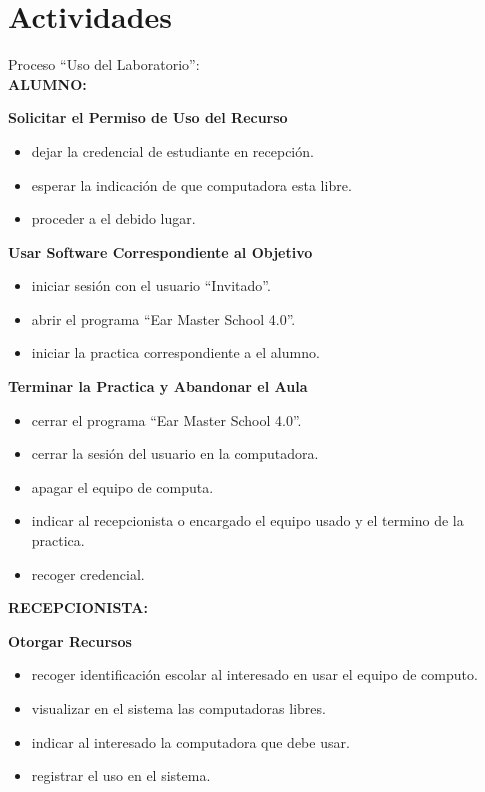 \documentclass[spanish,12pt,letterpapper]{article}
\begin{document}
	\section{Actividades}
	Proceso ``Uso del Laboratorio'':\\
	
	\textbf{ALUMNO:\\}
	
	\textbf{Solicitar el Permiso de Uso del Recurso}
	\begin{itemize}
	\item dejar la credencial de estudiante en recepción.
	\item esperar la indicación de que computadora esta libre.
	\item proceder a el debido lugar.\\
	\end{itemize}
	
	\textbf{Usar Software Correspondiente al Objetivo}
	\begin{itemize}
	\item iniciar sesión con el usuario ``Invitado''.
	\item abrir el programa ``Ear Master School 4.0''.
	\item iniciar la practica correspondiente a el alumno.\\
	\end{itemize}
	
	\textbf{Terminar la Practica y Abandonar el Aula}
	\begin{itemize}
	\item cerrar el programa ``Ear Master School 4.0''.
	\item cerrar la sesión del usuario en la computadora.
	\item apagar el equipo de computa.
	\item indicar al recepcionista o encargado el equipo usado y el termino de la practica.
	\item recoger credencial.\\
	\end{itemize}
	
	\textbf{RECEPCIONISTA:\\}
	
	\textbf{Otorgar Recursos}
	\begin{itemize}
	\item recoger identificación escolar al interesado en usar el equipo de computo.
	\item visualizar en el sistema las computadoras libres.
	\item indicar al interesado la computadora que debe usar.
	\item registrar el uso en el sistema.\\
	\end{itemize}
	
\end{document}
